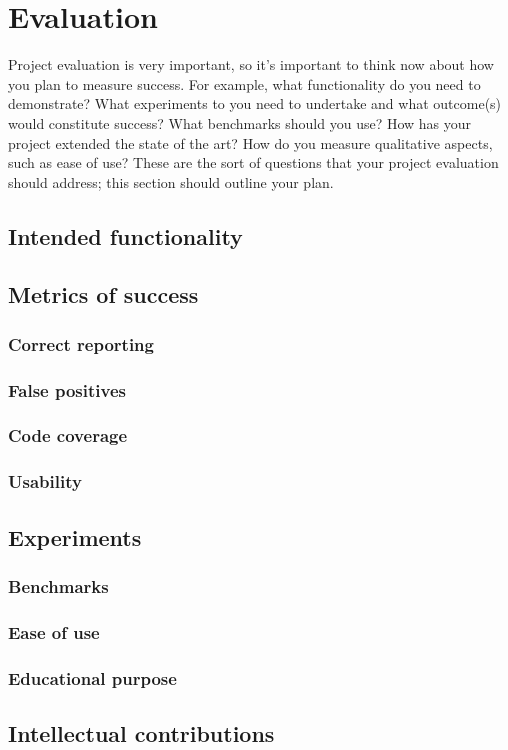 
\chapter{Evaluation}

Project evaluation is very important, so it's important to think now about how you plan to measure success. For example, what functionality do you need to demonstrate?  What experiments to you need to undertake and what outcome(s) would constitute success?  What benchmarks should you use? How has your project extended the state of the art?  How do you measure qualitative aspects, such as ease of use?  These are the sort of questions that your project evaluation should address; this section should outline your plan.


\section{Intended functionality}

\section{Metrics of success}

\subsection{Correct reporting}

\subsection{False positives}

\subsection{Code coverage}

\subsection{Usability}

\section{Experiments}

\subsection{Benchmarks}

\subsection{Ease of use}

\subsection{Educational purpose}

\section{Intellectual contributions}
